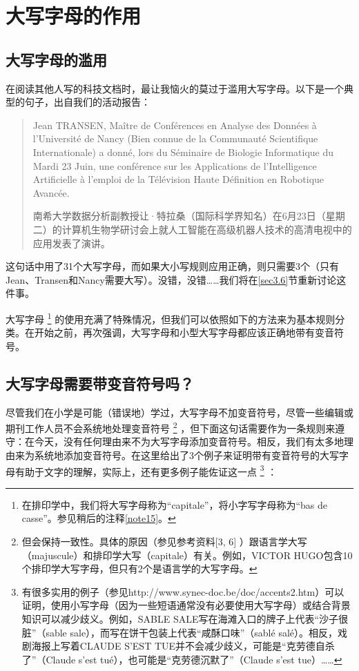 \chapter{大写字母的作用}

\section{大写字母的滥用}

在阅读其他人写的科技文档时，最让我恼火的莫过于滥用大写字母。以下是一个典型的句子，出自我们的活动报告：

\begin{quote}
    Jean TRANSEN, Maître de Conférences en Analyse des Données à l'Université de Nancy (Bien connue de la Communauté Scientifique Internationale) a donné, lors du Séminaire de Biologie Informatique du Mardi 23 Juin, une conférence sur les Applications de l'Intelligence Artificielle à l'emploi de la Télévision Haute Définition en Robotique Avancée.

    \begin{bil}
        南希大学数据分析副教授让·特拉桑（国际科学界知名）在6月23日（星期二）的计算机生物学研讨会上就人工智能在高级机器人技术的高清电视中的应用发表了演讲。
    \end{bil}
\end{quote}
    
这句话中用了31个大写字母，而如果大小写规则应用正确，则只需要3个（只有Jean、Transen和Nancy需要大写）。没错，没错……我们将在\ref{sec3.6}节重新讨论这件事。

大写字母
    \footnote{在排印学中，我们将大写字母称为``capitale''，将小字写字母称为``bas de casse''。参见稍后的注释\ref{note15}。}
的使用充满了特殊情况，但我们可以依照如下的方法来为基本规则分类。在开始之前，再次强调，大写字母和小型大写字母都应该正确地带有变音符号。

\section{大写字母需要带变音符号吗？}

尽管我们在小学是可能（错误地）学过，大写字母不加变音符号，尽管一些编辑或期刊工作人员不会系统地处理变音符号
    \footnote{但会保持一致性。具体的原因（参见参考资料[3, 6]%
    ）跟语言学大写（majuscule）和排印学大写（capitale）有关。例如，VICTOR HUGO包含10个排印学大写字母，但只有2个是语言学的大写字母。}
，但下面这句话需要作为一条规则来遵守：在今天，没有任何理由来不为大写字母添加变音符号。相反，我们有太多地理由来为系统地添加变音符号。在这里给出了3个例子来证明带有变音符号的大写字母有助于文字的理解，实际上，还有更多例子能佐证这一点
    \footnote{有很多实用的例子（参见http://www.synec-doc.be/doc/accents2.htm）可以证明，使用小写字母（因为一些短语通常没有必要使用大写字母）或结合背景知识可以减少歧义。例如，SABLE SALE写在海滩入口的牌子上代表``沙子很脏''（sable sale），而写在饼干包装上代表``咸酥口味''（sablé salé）。相反，戏剧海报上写着CLAUDE S'EST TUE并不会减少歧义，可能是``克劳德自杀了''（Claude s'est tué），也可能是``克劳德沉默了''（Claude s'est tue）……}
：

